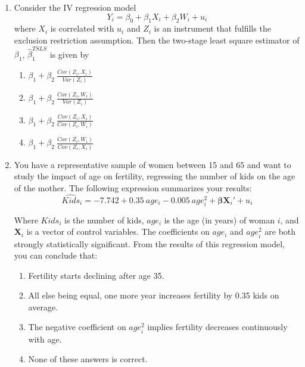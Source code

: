 \documentclass{article}
\begin{document}
\begin{enumerate}
\item Consider the IV regression model
\begin{equation*}
    Y_i = \beta_0 + \beta_1 X_i + \beta_2 W_i + u_i
\end{equation*}
where $X_i$ is correlated with $u_i$ and $Z_i$ is an instrument that fulfills the exclusion restriction assumption. Then the two-stage least square estimator of $\beta_1$, $\hat{\beta}_1^{TSLS}$ is given by
\begin{enumerate}[label=\alph*)]
\item $\beta_1+\beta_2~\frac{Cov(Z_i, X_i)}{Var(Z_i)}$
\item $\beta_1+\beta_2~\frac{Cov(Z_i, W_i)}{Var(Z_i)}$ 
\item $\beta_1+\beta_2~\frac{Cov(Z_i, X_i)}{Cov(Z_i, W_i)}$
\item $\beta_1+\beta_2~\frac{Cov(Z_i, W_i)}{Cov(Z_i, X_i)}$ 
\end{enumerate}\vspace{.25cm}

\newpage

\item You have a representative sample of women between 15 and 65 and want to study the impact of age on fertility, regressing the number of kids on the age of the mother. The following expression summarizes your results:
\begin{equation*}
    \widehat{Kids}_i = -7.742 + 0.35~age_i - 0.005~age_i^2 + \mathbf{\beta}\textbf{X}_{i}' + u_i
\end{equation*}

Where $Kids_i$ is the number of kids, $age_i$ is the age (in years) of woman $i$, and $\textbf{X}_{i}$ is a vector of control variables. The coefficients on $age_i$ and $age_i^2$ are both strongly statistically significant. From the results of this regression model, you can conclude that:

\begin{enumerate}[label=\alph*)]
\item Fertility starts declining after age 35.
\item All else being equal, one more year increases fertility by 0.35 kids on average.
\item The negative coefficient on  $age_i^2$ implies fertility decreases continuously with age.
\item None of these answers is correct.
\end{enumerate}\vspace{.25cm}


\end{enumerate}
\end{document}

